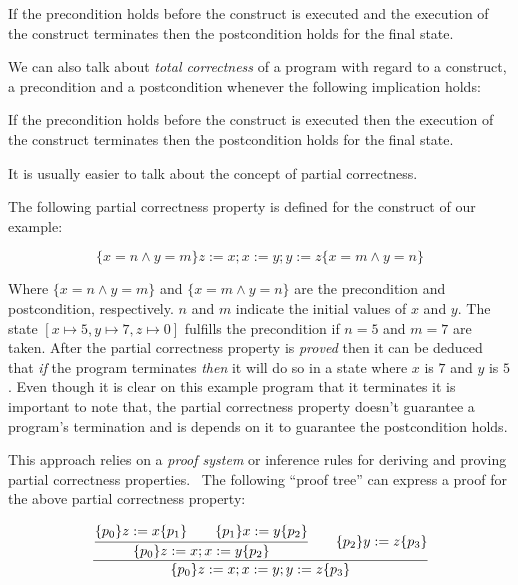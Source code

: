 \begin{displayquote}
If the precondition holds before the construct is executed and the execution of the construct terminates then the postcondition holds for the final state.
\end{displayquote}

We can also talk about \textit{total correctness} of a program with regard to a construct, a precondition and a postcondition whenever the following implication holds:

\begin{displayquote}
If the precondition holds before the construct is executed then the execution of the construct terminates then the postcondition holds for the final state.
\end{displayquote}

It is usually easier to talk about the concept of partial correctness.~\parencite{nipkow}


The following partial correctness property is defined for the construct of our example:

\begin{equation*}
\lbrace x=n \land y=m \rbrace z:=x; x:=y; y:=z \lbrace x=m \land y=n \rbrace
\end{equation*}

Where $\lbrace x=n \land y=m \rbrace $ and $\lbrace x=m \land y=n \rbrace $ are the precondition and postcondition, respectively.
$n$ and $m$ indicate the initial values of $x$ and $y$.
The state $[x\mapsto5, y\mapsto7, z\mapsto0]$ fulfills the precondition if $n=5$ and $m=7$ are taken.
After the partial correctness property is \textit{proved} then it can be deduced that \textit{if} the program terminates \textit{then} it will do so in a state where $x$ is $7$ and $y$ is $5$.
Even though it is clear on this example program that it terminates it is important to note that, the partial correctness property doesn't guarantee a program's termination and is depends on it to guarantee the postcondition holds.

This approach relies on a \textit{proof system} or inference rules for deriving and proving partial correctness properties.~\parencite{nipkow}
The following ``proof tree'' can express a proof for the above partial correctness property:

\begin{equation*}
\cfrac{
  \cfrac{ \lbrace p_{0} \rbrace z:=x \lbrace p_{1} \rbrace \qquad \lbrace p_{1} \rbrace x:=y \lbrace p_{2} \rbrace }
    { \lbrace p_{0} \rbrace z:=x; x:=y \lbrace p_{2} \rbrace }
  \qquad
 \lbrace p_{2} \rbrace y:=z \lbrace p_{3} \rbrace
  }
  { \lbrace p_{0} \rbrace z:=x; x:=y; y:=z \lbrace p_{3} \rbrace }
\end{equation*}

